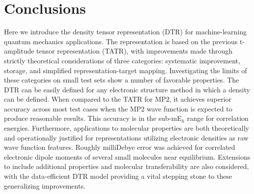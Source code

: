 \section{Conclusions} \label{conc}
Here we introduce the density tensor representation (DTR) for machine-learning quantum mechanics applications. 
The representation is based on the previous t-amplitude tensor representation (TATR), with improvements made through strictly theoretical considerations of three categories: systematic improvement, storage, and simplified representation-target mapping. Investigating the limits of these categories on small test sets show a number of favorable properties. 
The DTR can be easily defined for any electronic structure method in which a density can be defined. When compared to the TATR for MP2, it achieves superior accuracy across most test cases when the MP2 wave function is expected to produce reasonable results. This accuracy is in the sub-mE$_h$ range for correlation energies. 
Furthermore, applications to molecular properties are both theoretically and operationally justified for representations utilizing electronic densities as raw wave function features. 
Roughly milliDebye error was achieved for correlated electronic dipole moments of several small molecules near equilibrium.
Extensions to include additional properties and molecular transferability are also considered, with the data-efficient DTR model providing a vital stepping stone to these generalizing improvements. 
